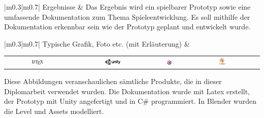 \vspace{10pt}

\noindent
\begin{tabular}{|m{0.3\textwidth}|m{0.7\textwidth}|}
\hline
Ergebnisse & Das Ergebnis wird ein spielbarer Prototyp sowie eine umfassende Dokumentation zum Thema Spieleentwicklung. Es soll mithilfe der Dokumentation erkennbar sein wie der Prototyp geplant und entwickelt wurde.  \\
\hline
\end{tabular}

\pagebreak
\pagebreak
\noindent
\begin{tabular}{|m{0.3\textwidth}|m{0.7\textwidth}|}
\hline
Typische Grafik, Foto etc. (mit Erläuterung) &
\begin{minipage}{\linewidth}
  \centering
  \begin{tabular}{cccc}
    \includegraphics[width=0.2\textwidth]{chapters/00/images/latex.png} &
    \includegraphics[width=0.2\textwidth]{chapters/00/images/unity.png} &
    \includegraphics[width=0.2\textwidth]{chapters/00/images/Csharp.png} &
    \includegraphics[width=0.2\textwidth]{chapters/00/images/blender.png}
  \end{tabular}
  
  \vspace{10pt}
  
  \begin{flushleft}
    Diese Abbildungen veranschaulichen sämtliche Produkte, die in dieser Diplomarbeit verwendet wurden. Die Dokumentation wurde mit Latex erstellt, der Prototyp mit Unity angefertigt und in C\# programmiert. In Blender wurden die Level und Assets modelliert.
  \end{flushleft}
  
  \vspace{10pt}

\end{minipage} \\
\hline
\end{tabular}

